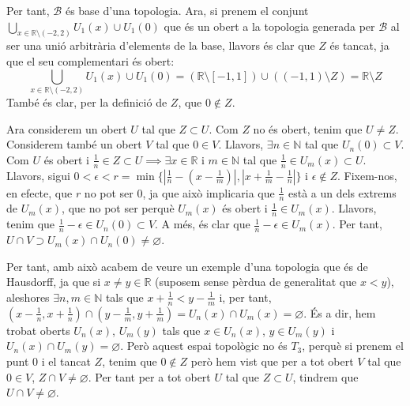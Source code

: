 \documentclass[10pt,a4paper]{article}
\theoremstyle{definition}
\newcommand{\NN}{\ensuremath{\mathbb{N}}}
\newcommand{\RR}{\ensuremath{\mathbb{R}}}
\begin{document}
Per tant, $\mathcal B$ és base d'una topologia. Ara, si prenem el conjunt $\bigcup_{x\in \mathbb R \setminus (-2,2)}U_1(x) \cup U_1(0)$ que és un obert a la topologia generada per $\mathcal B$ al ser una unió arbitrària d'elements de la base, llavors és clar que $Z$ és tancat, ja que el seu complementari és obert:
$$\bigcup_{x\in \mathbb R \setminus (-2,2)}U_1(x) \cup U_1(0)=(\RR\setminus[-1,1])\cup ((-1,1)\setminus Z)=\RR\setminus Z$$ També és clar, per la definició de $Z$, que $0\notin Z$.

Ara considerem un obert $U$ tal que $Z\subset U$. Com $Z$ no és obert, tenim que $U \neq Z$. Considerem també un obert $V$ tal que $0\in V$. Llavors, $\exists n\in \mathbb N$ tal que $U_n(0)\subset V$. Com $U$ és obert i $\frac{1}{n}\in Z \subset U \implies \exists x\in \mathbb R$ i $m\in \mathbb N$ tal que $\frac{1}{n}\in U_m(x)\subset U$. Llavors, sigui $0<\epsilon <r=\min\{\left|\frac{1}{n}-\left(x-\frac{1}{m}\right)\right|, \left|x+\frac{1}{m}-\frac{1}{n}\right|\} $ i $\epsilon \notin Z$. Fixem-nos, en efecte, que $r$ no pot ser 0, ja que això implicaria que $\frac{1}{n}$ està a un dels extrems de $U_m(x)$, que no pot ser perquè $U_m(x)$ és obert i $\frac{1}{n}\in U_m(x)$. Llavors, tenim que $\frac{1}{n}-\epsilon \in U_n(0)\subset V$. A més, és clar que $\frac{1}{n}-\epsilon\in U_m(x)$. Per tant, $U\cap V\supset U_m(x)\cap U_n(0) \neq \varnothing$.

Per tant, amb això acabem de veure un exemple d'una topologia que és de Hausdorff, ja que si $x\ne y\in \RR$ (suposem sense pèrdua de generalitat que $x<y$), aleshores $\exists n,m\in\NN$ tals que $x+\frac{1}{n}<y-\frac{1}{m}$ i, per tant, $(x-\frac{1}{n},x+\frac{1}{n})\cap(y-\frac{1}{m},y+\frac{1}{m})=U_n(x)\cap U_m(x)=\varnothing$. És a dir, hem trobat oberts $U_n(x)$, $U_m(y)$ tals que $x\in U_n(x)$, $y\in U_m(y)$ i $U_n(x)\cap U_m(y)=\varnothing$. Però aquest espai topològic no és $T_3$, perquè si prenem el punt 0 i el tancat $Z$, tenim que $0\notin Z$ però hem vist que per a tot obert $V$ tal que $0\in V$, $Z\cap V\ne\varnothing$. Per tant per a tot obert $U$ tal que $Z\subset U$, tindrem que $U\cap V\ne\varnothing$.
\end{document}
